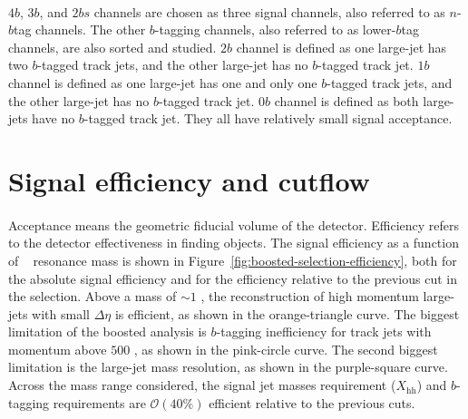 \paragraph{}
$4b$, $3b$, and $2bs$ channels are chosen as three signal channels, also referred to as $n$-$b$tag channels.
The other $b$-tagging channels, also referred to as lower-$b$tag channels, are also sorted and studied.
$2b$ channel is defined as one large-\R jet has two $b$-tagged track jets, and the other large-\R jet has no $b$-tagged track jet. 
$1b$ channel is defined as one large-\R jet has one and only one $b$-tagged track jets, and the other large-\R jet has no $b$-tagged track jet. 
$0b$ channel is defined as both large-\R jets have no $b$-tagged track jet. 
They all have relatively small signal acceptance. 



\section{Signal efficiency and cutflow}
\paragraph{}
Acceptance means the geometric fiducial volume of the detector. 
Efficiency refers to the detector effectiveness in finding objects.
The signal efficiency as a function of \Grav~ resonance mass is shown in Figure~\ref{fig:boosted-selection-efficiency}, both for the absolute signal efficiency and for the efficiency relative to the previous cut in the selection.
Above a mass of $\sim\!1$ \TeV, the reconstruction of high momentum large-\R jets with small $\Delta\eta$ is efficient, as shown in the orange-triangle curve.
The biggest limitation of the boosted analysis is $b$-tagging inefficiency for track jets with momentum above $500$ \GeV, as shown in the pink-circle curve.
The second biggest limitation is the large-\R jet mass resolution, as shown in the purple-square curve.
Across the mass range considered, the signal jet masses requirement ($X_\text{hh}$) and $b$-tagging requirements are $\mathcal{O}(40\%)$ efficient relative to the previous cuts.


